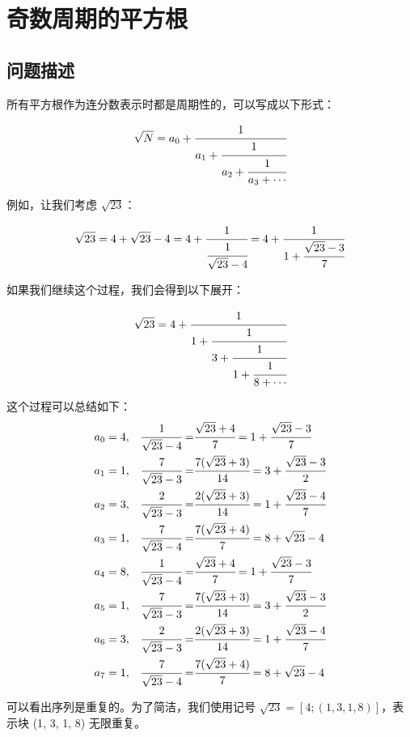 \section{奇数周期的平方根}
\subsection{问题描述}
\begin{tcolorbox}[breakable]
	所有平方根作为连分数表示时都是周期性的，可以写成以下形式：

	\[ \sqrt{N} = a_0 + \cfrac{1}{a_1 + \cfrac{1}{a_2 + \cfrac{1}{a_3 + \cdots}}} \]

	例如，让我们考虑 $\sqrt{23}$：

	\[ \sqrt{23} = 4 + \sqrt{23} - 4 = 4 + \cfrac{1}{\cfrac{1}{\sqrt{23} - 4}} = 4 + \cfrac{1}{1 + \cfrac{\sqrt{23} - 3}{7}} \]

	如果我们继续这个过程，我们会得到以下展开：

	\[ \sqrt{23} = 4 + \cfrac{1}{1 + \cfrac{1}{3 + \cfrac{1}{1 + \cfrac{1}{8 + \cdots}}}} \]

	这个过程可以总结如下：
	\begin{align*}
		a_0 & = 4, & \cfrac{1}{\sqrt{23} - 4}  = & \cfrac{\sqrt{23} + 4}{7}      = 1 + \cfrac{\sqrt{23} - 3}{7} \\
		a_1 & = 1, & \cfrac{7}{\sqrt{23} - 3}  = & \cfrac{7(\sqrt{23} + 3)}{14}  = 3 + \cfrac{\sqrt{23} - 3}{2} \\
		a_2 & = 3, & \cfrac{2}{\sqrt{23} - 3}  = & \cfrac{2(\sqrt{23} + 3)}{14}  = 1 + \cfrac{\sqrt{23} - 4}{7} \\
		a_3 & = 1, & \cfrac{7}{\sqrt{23} - 4}  = & \cfrac{7(\sqrt{23} + 4)}{7}   = 8 + \sqrt{23} - 4            \\
		a_4 & = 8, & \cfrac{1}{\sqrt{23} - 4}  = & \cfrac{\sqrt{23} + 4}{7} = 1 + \cfrac{\sqrt{23} - 3}{7}      \\
		a_5 & = 1, & \cfrac{7}{\sqrt{23} - 3}  = & \cfrac{7(\sqrt{23} + 3)}{14} = 3 + \cfrac{\sqrt{23} - 3}{2}  \\
		a_6 & = 3, & \cfrac{2}{\sqrt{23} - 3}  = & \cfrac{2(\sqrt{23} + 3)}{14} = 1 + \cfrac{\sqrt{23} - 4}{7}  \\
		a_7 & = 1, & \cfrac{7}{\sqrt{23} - 4}  = & \cfrac{7(\sqrt{23} + 4)}{7} = 8 + \sqrt{23} - 4              \\
	\end{align*}

	可以看出序列是重复的。为了简洁，我们使用记号 $\sqrt{23} = [4; (1, 3, 1, 8)]$，表示块 (1, 3, 1, 8) 无限重复。


\end{tcolorbox}

